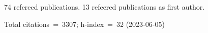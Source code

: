 74 refereed publications. 13 refeered publications as first author.

Total citations~=~3307; h-index~=~32 (2023-06-05)